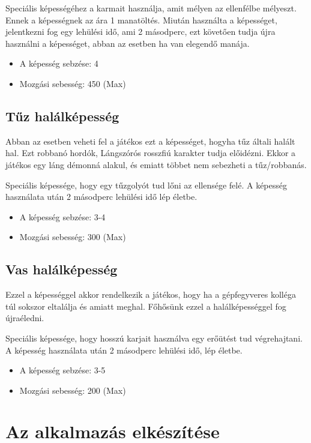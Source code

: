 \documentclass[a4paper]{article}
\begin{document}
Speciális képességéhez a karmait használja, amit mélyen az ellenfélbe mélyeszt.
Ennek a képességnek az ára 1 manatöltés.
Miután használta a képességet, jelentkezni fog egy lehülési idő, ami 2 másodperc, ezt követően tudja újra használni a képességet, abban az esetben ha van elegendő manája.

\begin{itemize}
\item A képesség sebzése: 4
\item Mozgási sebesség: 450 (Max)
\end{itemize}

\subsection{Tűz halálképesség}

Abban az esetben veheti fel a játékos ezt a képességet, hogyha tűz általi halált hal.
Ezt robbanó hordók, Lángszórós rosszfiú karakter tudja előidézni.
Ekkor a játékos egy láng démonná alakul, és emiatt többet nem sebezheti a tűz/robbanás.

Speciális képessége, hogy egy tűzgolyót tud lőni az ellensége felé.
A képesség használata után 2 másodperc lehülési idő lép életbe.

\begin{itemize}
\item A képesség sebzése: 3-4
\item Mozgási sebesség: 300 (Max)
\end{itemize}

\subsection{Vas halálképesség}

Ezzel a képességgel akkor rendelkezik a játékos, hogy ha a gépfegyveres kolléga túl sokszor eltalálja és amiatt meghal.
Főhősünk ezzel a halálképességgel fog újraéledni.

Speciális képessége, hogy hosszú karjait használva egy erőütést tud végrehajtani.
A képesség használata után 2 másodperc lehülési idő, lép életbe.

\begin{itemize}
\item A képesség sebzése: 3-5
\item Mozgási sebesség: 200 (Max)
\end{itemize}

\section{Az alkalmazás elkészítése}
\end{document}
